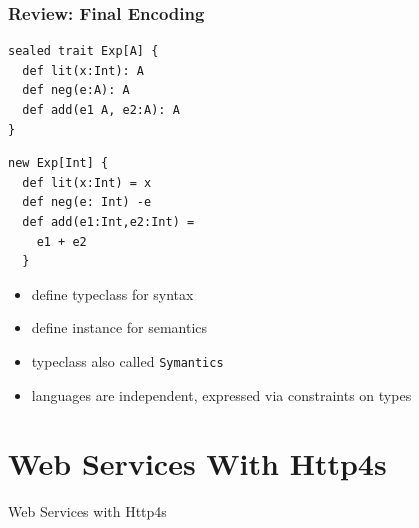 \documentclass{beamer}
\begin{document}
\begin{frame}[fragile]
  \frametitle{Review: Final Encoding}
  \begin{minipage}[frame=none]{0.45\linewidth}
\begin{verbatim}
sealed trait Exp[A] {
  def lit(x:Int): A
  def neg(e:A): A
  def add(e1 A, e2:A): A
}
\end{verbatim}
  \end{minipage}
  \begin{minipage}[frame=none]{0.45\linewidth}
\begin{verbatim}
new Exp[Int] {
  def lit(x:Int) = x
  def neg(e: Int) -e
  def add(e1:Int,e2:Int) =
    e1 + e2
  }
\end{verbatim}
  \end{minipage}
  \begin{itemize}
  \item define typeclass for syntax
  \item define instance for semantics
  \item typeclass also called \texttt{Symantics}
  \item languages are independent, expressed via constraints on types
  \end{itemize}
\end{frame}

\section{Web Services With Http4s}

\begin{frame}
  \begin{center}
    \Huge Web Services with Http4s
  \end{center}
\end{frame}
\end{document}

